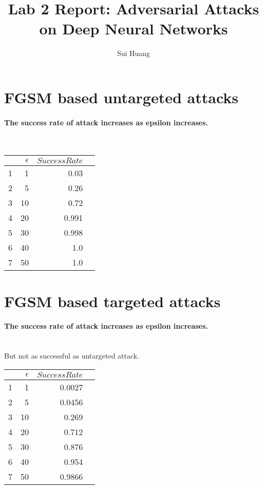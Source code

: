 \documentclass{article}
\begin{document}
\author{Sui Huang}
\title{Lab 2 Report: Adversarial Attacks on Deep Neural Networks}
\maketitle

\section{FGSM based untargeted attacks}
\paragraph{The success rate of attack increases as epsilon increases.} \mbox{}\\

\begin{table}[h]
\centering    
 \begin{tabular}{rrrr} 
     \hline
	\hline
       & $\epsilon $ & $ Success Rate $\\ [0.5ex]
       \hline
       1 & 1 & 0.03  \\
       2 & 5 & 0.26  \\
       3 & 10 & 0.72 \\
       4 & 20 & 0.991 \\
       5 & 30 & 0.998  \\
       6 & 40 & 1.0  \\
       7 & 50 & 1.0  \\
       \hline
       \hline
   \end{tabular}
\end{table}

\section{FGSM based targeted attacks}
\paragraph{The success rate of attack increases as epsilon increases.}\mbox{}\\ But not as successful as untargeted attack.
\begin{table}[h]
\centering    
 \begin{tabular}{rrrr} 
     \hline
	\hline
       & $\epsilon $ & $ Success Rate $\\ [0.5ex]
       \hline
       1 & 1 & 0.0027  \\
       2 & 5 & 0.0456  \\
       3 & 10 & 0.269 \\
       4 & 20 & 0.712 \\
       5 & 30 & 0.876  \\
       6 & 40 & 0.954 \\
       7 & 50 & 0.9866 \\
       \hline
       \hline
   \end{tabular}
\end{table}
\end{document}
